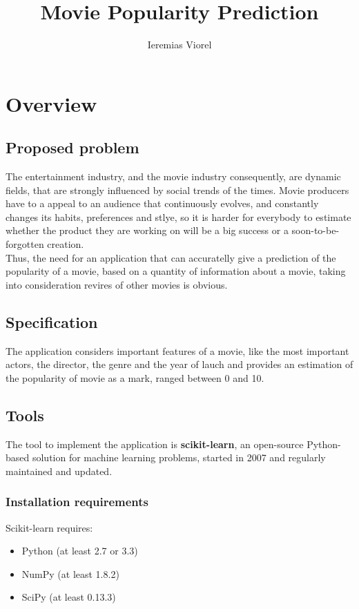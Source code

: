 \documentclass[a4paper,10pt]{article}
\title{Movie Popularity Prediction}
\author{Ieremias Viorel}
\begin{document}
\maketitle

\tableofcontents

\section{Overview}

\subsection{Proposed problem}
The entertainment industry, and the movie industry consequently, are dynamic fields, that are strongly influenced by social trends of the times. Movie producers have to a appeal to an audience that continuously evolves, and constantly changes its habits, preferences and stlye, so it is harder for everybody to estimate whether the product they are working on will be a big success or a soon-to-be-forgotten creation.\\
Thus, the need for an application that can accuratelly give a prediction of the popularity  of a movie, based on a quantity of information about a movie, taking into consideration revires of other movies is obvious.

\subsection{Specification}
The application considers important features of a movie, like the most important actors, the director, the genre and the year of lauch and provides an estimation of the popularity of movie as a mark, ranged between 0 and 10.
  
\subsection{Tools}
The tool to implement the application is \textbf{scikit-learn}, an open-source Python-based solution for machine learning problems, started in 2007 and regularly maintained and updated.
\subsubsection{Installation requirements}
Scikit-learn requires:
\begin{itemize}
	\item Python (at least 2.7 or 3.3)
	\item NumPy (at least 1.8.2)
	\item SciPy (at least 0.13.3)
\end{itemize}
\end{document}

